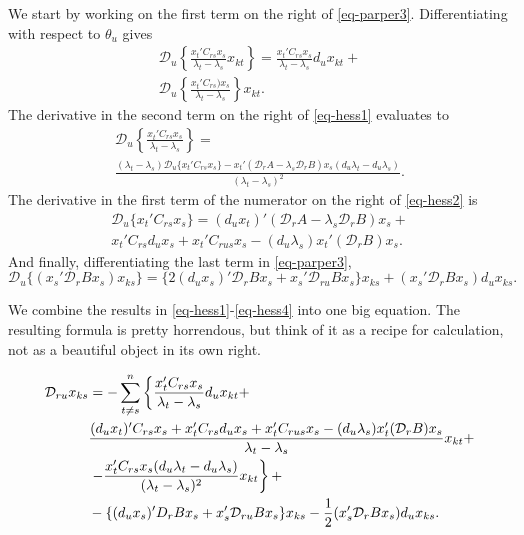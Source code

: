 \documentclass[
  12pt,
  letterpaper,
  DIV=11,
  numbers=noendperiod]{scrartcl}
\begin{document}
We start by working on the first term on the right of
\eqref{eq-parper3}. Differentiating with respect to \(\theta_u\) gives
\begin{multline}
\mathcal{D}_{u}\left\{\frac{x_t'C_{rs}x_s}{\lambda_t-\lambda_s}x_{kt}\right\}=\frac{x_t'C_{rs}x_s}{\lambda_t-\lambda_s}d_ux_{kt}+
\\\mathcal{D}_{u}\left\{\frac{x_t'C_{rs})x_s}{\lambda_t-\lambda_s}\right\}x_{kt}.\label{eq-hess1}
\end{multline} The derivative in the second term on the right of
\eqref{eq-hess1} evaluates to \begin{multline}
\mathcal{D}_{u}\left\{\frac{x_t'C_{rs}x_s}{\lambda_t-\lambda_s}\right\}=\\
\frac{(\lambda_t-\lambda_s)\mathcal{D}_u\{x_t'C_{rs}x_s\}-x_t'(\mathcal{D}_rA-\lambda_s\mathcal{D}_rB)x_s(d_u\lambda_t-d_u\lambda_s)}{(\lambda_t-\lambda_s)^2}.\label{eq-hess2}
\end{multline} The derivative in the first term of the numerator on the
right of \eqref{eq-hess2} is \begin{multline}
\mathcal{D}_u\{x_t'C_{rs}x_s\}=
(d_ux_t)'(\mathcal{D}_rA-\lambda_s\mathcal{D}_rB)x_s+\\
x_t'C_{rs}d_ux_s+
x_t'C_{rus}x_s-(d_u\lambda_s)x_t'(\mathcal{D}_rB)x_s.
\label{eq-hess3}\end{multline} And finally, differentiating the last
term in \eqref{eq-parper3}, \begin{equation}
\mathcal{D}_u\{(x_s'\mathcal{D}_rBx_s)x_{ks}\}=\{2(d_ux_s)'\mathcal{D}_rBx_s+x_s'\mathcal{D}_{ru}Bx_s\}x_{ks}+(x_s'\mathcal{D}_rBx_s)d_ux_{ks}.
\label{eq-hess4}
\end{equation}

We combine the results in \eqref{eq-hess1}-\eqref{eq-hess4} into one big
equation. The resulting formula is pretty horrendous, but think of it as
a recipe for calculation, not as a beautiful object in its own right.

\begin{align}
\mathcal{D}_{ru}x_{ks}&=-\sum_{t\not= s}^n\left\{
\frac{x_t'C_{rs}x_s}{\lambda_t-\lambda_s}d_ux_{kt}+\right.\notag\\
&\frac{(d_ux_t)'C_{rs}x_s+x_t'C_{rs}d_ux_s+
x_t'C_{rus}x_s-(d_u\lambda_s)x_t'(\mathcal{D}_rB)x_s}{\lambda_t-\lambda_s}x_{kt}+\notag\\
&\left.-\frac{x_t'C_{rs}x_s(d_u\lambda_t-d_u\lambda_s)}{(\lambda_t-\lambda_s)^2}x_{kt}\right\}+\notag\\
&-\{(d_ux_s)'D_rBx_s+x_s'\mathcal{D}_{ru}Bx_s\}x_{ks}-\frac12(x_s'\mathcal{D}_rBx_s)d_ux_{ks}.\label{eq-horrible}
\end{align}
\end{document}
